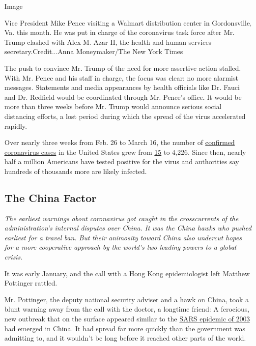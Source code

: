 Image

Vice President Mike Pence visiting a Walmart distribution center in
Gordonsville, Va. this month. He was put in charge of the coronavirus
task force after Mr. Trump clashed with Alex M. Azar II, the health and
human services secretary.Credit...Anna Moneymaker/The New York Times

The push to convince Mr. Trump of the need for more assertive action
stalled. With Mr. Pence and his staff in charge, the focus was clear: no
more alarmist messages. Statements and media appearances by health
officials like Dr. Fauci and Dr. Redfield would be coordinated through
Mr. Pence's office. It would be more than three weeks before Mr. Trump
would announce serious social distancing efforts, a lost period during
which the spread of the virus accelerated rapidly.

Over nearly three weeks from Feb. 26 to March 16, the number of
\href{https://www.nytimes.com/interactive/2020/us/coronavirus-us-cases.html\#map}{confirmed
coronavirus cases} in the United States grew from
\href{https://www.cdc.gov/media/releases/2020/s0226-Covid-19-spread.html}{15}
to 4,226. Since then, nearly half a million Americans have tested
positive for the virus and authorities say hundreds of thousands more
are likely infected.

\hypertarget{the-china-factor}{%
\subsection{The China Factor}\label{the-china-factor}}

\emph{The earliest warnings about coronavirus got caught in the
crosscurrents of the administration's internal disputes over China. It
was the China hawks who pushed earliest for a travel ban. But their
animosity toward China also undercut hopes for a more cooperative
approach by the world's two leading powers to a global crisis.}

It was early January, and the call with a Hong Kong epidemiologist left
Matthew Pottinger rattled.

Mr. Pottinger, the deputy national security adviser and a hawk on China,
took a blunt warning away from the call with the doctor, a longtime
friend: A ferocious, new outbreak that on the surface appeared similar
to the
\href{https://www.nytimes.com/2003/04/27/world/the-sars-epidemic-the-path-from-china-s-provinces-a-crafty-germ-breaks-out.html}{SARS
epidemic of 2003} had emerged in China. It had spread far more quickly
than the government was admitting to, and it wouldn't be long before it
reached other parts of the world.

